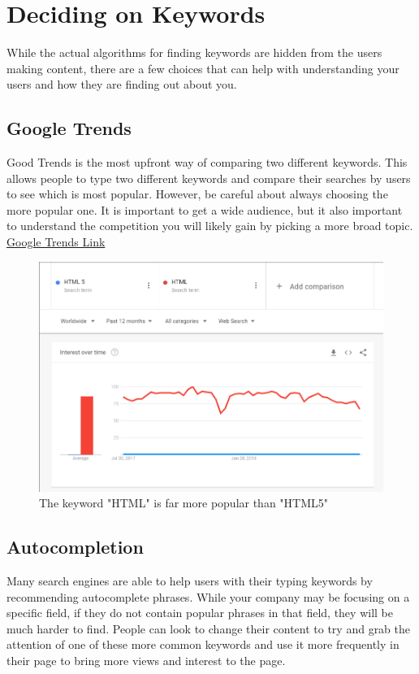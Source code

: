 \documentclass{article}
\begin{document}
\section{Deciding on Keywords}
While the actual algorithms for finding keywords are hidden from the users making content, there are a few choices that can help with understanding your users and how they are finding out about you. 
\subsection{Google Trends}
Good Trends is the most upfront way of comparing two different keywords. This allows people to type two different keywords and compare their searches by users to see which is most popular. However, be careful about always choosing the more popular one. It is important to get a wide audience, but it also important to understand the competition you will likely gain by picking a more broad topic.
\hyperlink{http://trends.google.com/trends/explore}{Google Trends Link}

\begin{figure}[h]
\centering
\includegraphics[width=\textwidth]{images/HTML.png}
\caption{The keyword "HTML" is far more popular than "HTML5"}
\end{figure}

\subsection{Autocompletion}
Many search engines are able to help users with their typing keywords by recommending autocomplete phrases. While your company may be focusing on a specific field, if they do not contain popular phrases in that field, they will be much harder to find. People can look to change their content to try and grab the attention of one of these more common keywords and use it more frequently in their page to bring more views and interest to the page.
\end{document}
